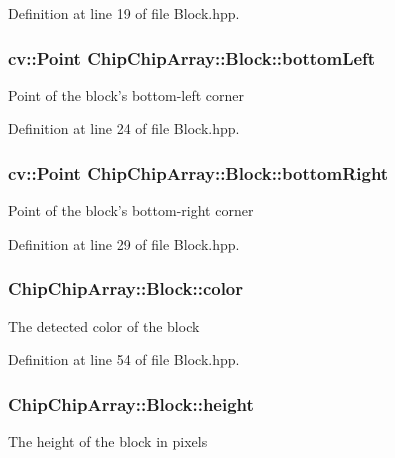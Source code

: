Definition at line 19 of file Block.\+hpp.

\hypertarget{classChipChipArray_1_1Block_a78304b597a8d8a74a4d9b4bb561a7224}{
\subsubsection[{bottom\+Left}]{\setlength{\rightskip}{0pt plus 5cm}cv\+::\+Point Chip\+Chip\+Array\+::\+Block\+::bottom\+Left}}\label{classChipChipArray_1_1Block_a78304b597a8d8a74a4d9b4bb561a7224}
Point of the block's bottom-\/left corner 

Definition at line 24 of file Block.\+hpp.

\hypertarget{classChipChipArray_1_1Block_a82f831883d31e6d74be45b8851eefe96}{
\subsubsection[{bottom\+Right}]{\setlength{\rightskip}{0pt plus 5cm}cv\+::\+Point Chip\+Chip\+Array\+::\+Block\+::bottom\+Right}}\label{classChipChipArray_1_1Block_a82f831883d31e6d74be45b8851eefe96}
Point of the block's bottom-\/right corner 

Definition at line 29 of file Block.\+hpp.

\hypertarget{classChipChipArray_1_1Block_a262210a9a04028f3f2670c9ae38ef3d7}{
\subsubsection[{color}]{ Chip\+Chip\+Array\+::\+Block\+::color}}\label{classChipChipArray_1_1Block_a262210a9a04028f3f2670c9ae38ef3d7}
The detected color of the block 

Definition at line 54 of file Block.\+hpp.

\hypertarget{classChipChipArray_1_1Block_aed94802c166c9b4553764eb637717a2a}{
\subsubsection[{height}]{ Chip\+Chip\+Array\+::\+Block\+::height}}\label{classChipChipArray_1_1Block_aed94802c166c9b4553764eb637717a2a}
The height of the block in pixels 

